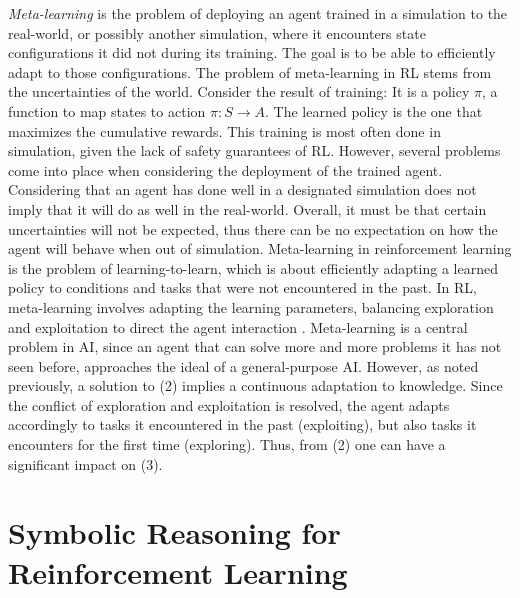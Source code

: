 \documentclass[a4paper,11pt]{article}
\theoremstyle{definition}
\begin{document}
\emph{Meta-learning} is the problem of deploying an agent trained in a simulation to
the real-world, or possibly another simulation, where it encounters
state configurations it did not during its training. The goal is to
be able to efficiently adapt to those configurations. The problem of meta-learning in RL stems from the uncertainties of the world. 
Consider the result of training: It is a policy $\pi$, a function to map states to action $\pi : S \rightarrow A$. The learned policy is the one that maximizes the cumulative rewards.
This training is most often done in simulation, given the lack of safety guarantees of RL. 
However, several problems come into place when considering the deployment of the trained agent. Considering that an agent has done well in 
a designated simulation does not imply that it will do as well in the real-world. Overall, it must be that certain uncertainties will not be expected, thus there can be no expectation on how the agent will behave 
when out of simulation. Meta-learning in reinforcement learning is the problem of learning-to-learn, which is about efficiently
adapting a learned policy to conditions and tasks that were not encountered in the past. In RL, meta-learning
involves adapting the learning parameters, balancing exploration and exploitation to direct the
agent interaction \cite{gupta_meta-reinforcement_2018,schweighofer_meta-learning_2003}. Meta-learning is a central problem in AI, since an agent that can solve more
and more problems it has not seen before, approaches the ideal of a general-purpose AI. However, as noted previously, a solution to (2) implies 
a continuous adaptation to knowledge. Since the conflict of exploration and exploitation is resolved, the agent adapts accordingly to tasks it encountered in the past (exploiting), but also 
tasks it encounters for the first time (exploring). Thus, from (2) one
can have a significant impact on (3).


\section{Symbolic Reasoning for Reinforcement Learning} 
\label{symrl}
\end{document}
